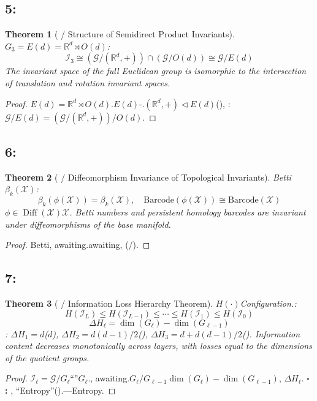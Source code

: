 \documentclass[11pt,a4paper]{article}
\theoremstyle{plain}
\newtheorem{theorem}{Theorem}[section]
\theoremstyle{definition}
\theoremstyle{remark}
\newcommand{\RR}{\mathbb{R}}
\newcommand{\cX}{\mathcal{X}}
\newcommand{\cG}{\mathcal{G}}
\newcommand{\cI}{\mathcal{I}}
\DeclareMathOperator{\Diff}{Diff}
\begin{document}
{\subsection{5:}
\begin{theorem}[ / Structure of Semidirect Product Invariants]
\label{thm:ilh-semidirect}
$G_3 = E(d) = \RR^d \rtimes O(d)$: 
\begin{equation}
\boxed{\cI_3 \cong (\cG / (\RR^d, +)) \cap (\cG / O(d)) \cong \cG / E(d)}
\end{equation}
\textit{The invariant space of the full Euclidean group is isomorphic to the intersection of translation and rotation invariant spaces.}
\end{theorem}
\begin{proof}
$E(d) = \RR^d \rtimes O(d)$.$E(d)$-.$(\RR^d, +) \triangleleft E(d)$(), : $\cG/E(d) = (\cG/(\RR^d, +))/O(d)$.
\end{proof}
\subsection{6:}
\begin{theorem}[ / Diffeomorphism Invariance of Topological Invariants]
\label{thm:ilh-diffeo}
Betti$\beta_k(\cX)$: 
\begin{equation}
\boxed{\beta_k(\phi(\cX)) = \beta_k(\cX), \quad \text{Barcode}(\phi(\cX)) \cong \text{Barcode}(\cX)}
\end{equation}
$\phi \in \Diff(\cX)$$\cX$.
\textit{Betti numbers and persistent homology barcodes are invariant under diffeomorphisms of the base manifold.}
\end{theorem}
\begin{proof}
Betti, awaiting.awaiting, (/).
\end{proof}
\subsection{7:}
\begin{theorem}[ / Information Loss Hierarchy Theorem]
\label{thm:ilh-information}
$H(\cdot)$Configuration.: 
\begin{equation}
\boxed{H(\cI_L) \leq H(\cI_{L-1}) \leq \cdots \leq H(\cI_1) \leq H(\cI_0)}
\end{equation}
\begin{equation}
 \Delta H_\ell = \dim(G_\ell) - \dim(G_{\ell-1})
\end{equation}
: $\Delta H_1 = d$($d$), $\Delta H_2 = d(d-1)/2$(), $\Delta H_3 = d + d(d-1)/2$().
\textit{Information content decreases monotonically across layers, with losses equal to the dimensions of the quotient groups.}
\end{theorem}
\begin{proof}
$\cI_\ell = \cG / G_\ell$``''$G_\ell$., awaiting.$G_{\ell} / G_{\ell-1}$$\dim(G_\ell) - \dim(G_{\ell-1})$, $\Delta H_\ell$.
$\square$ \textbf{: }, ``Entropy''().---Entropy.
\end{proof}
}
\end{document}
